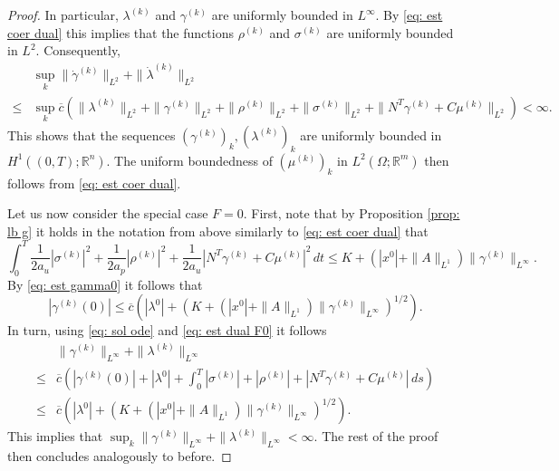 \documentclass[11pt]{article}
\newcommand{\R}{\mathbb R}
\newcommand{\eps}{{\varepsilon}}
\begin{document}
\begin{proof}
In particular, $\lambda^{(k)}$ and $\gamma^{(k)}$ are uniformly bounded in $L^{\infty}$. By \eqref{eq: est coer dual} this implies that the functions $\rho^{(k)}$ and $\sigma^{(k)}$ are uniformly bounded in $L^2$. Consequently, 
\begin{align*} 
&\sup_k \| \dot{\gamma}^{(k)} \|_{L^2} + \| \dot{\lambda}^{(k)} \|_{L^2}  \\ \leq &\sup_k \overline{c} \left( \| \lambda^{(k)} \|_{L^2} + \| \gamma^{(k)} \|_{L^2} + \| \rho^{(k)} \|_{L^2} + \| \sigma^{(k)} \|_{L^2} +  \| N^T \gamma^{(k)} + C \mu^{(k)}\|_{L^2} \right) < \infty.
\end{align*}
This shows that the sequences $(\gamma^{(k)})_k, (\lambda^{(k)})_k$ are uniformly bounded in $H^1((0,T);\R^n)$. The uniform boundedness of $(\mu^{(k)})_k$ in $L^2(\Omega;\R^m)$ then follows from \eqref{eq: est coer dual}. 

Let us now consider the special case $F=0$. 
First, note that by Proposition \ref{prop: lb g} it holds in the notation from above similarly to \eqref{eq: est coer dual} that
\begin{equation} \label{eq: est dual F0}
\int_0^T \frac1{2a_u} |\sigma^{(k)}|^2 + \frac1{2a_p} |\rho^{(k)} |^2 + \frac1{2a_u} |N^T\gamma^{(k)} + C \mu^{(k)}|^2  \, dt \leq K + (|x^0| + \| A \|_{L^1}) \| \gamma^{(k)} \|_{L^{\infty}}. 
\end{equation}
By \eqref{eq: est gamma0} it follows that
\[
|\gamma^{(k)}(0)| \leq \overline{c} \left( |\lambda^0| + ( K + (|x^0| + \| A \|_{L^1}) \| \gamma^{(k)} \|_{L^{\infty}})^{1/2} \right).
\]
In turn, using \eqref{eq: sol ode} and \eqref{eq: est dual F0} it follows
\begin{align}
     &\| \gamma^{(k)} \|_{L^{\infty}} + \| \lambda^{(k)} \|_{L^{\infty}} \\
    \leq &\overline{c} \left( |\gamma^{(k)}(0)| +  |\lambda^0| + \int_0^T |\sigma^{(k)}| + |\rho^{(k)}| + |N^T\gamma^{(k)} + C \mu^{(k)}| \, ds \right) \\
    \leq &\overline{c} \left( |\lambda^0| + ( K + (|x^0| + \| A \|_{L^1}) \| \gamma^{(k)} \|_{L^{\infty}})^{1/2} \right).
\end{align}
This implies that $\sup_k \| \gamma^{(k)} \|_{L^{\infty}} + \| \lambda^{(k)} \|_{L^{\infty}} < \infty$. The rest of the proof then concludes analogously to before.


\end{proof}
\end{document}
